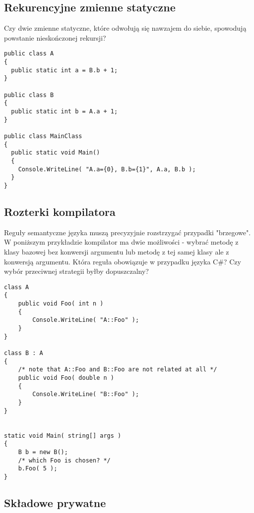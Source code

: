 \subsection{Rekurencyjne zmienne statyczne}

Czy dwie zmienne statyczne, które odwołują się nawzajem do siebie, spowodują powstanie nieskończonej rekursji?

\begin{scriptsize}
\begin{verbatim}
public class A
{
  public static int a = B.b + 1;
}

public class B
{
  public static int b = A.a + 1;
}
 
public class MainClass
{
  public static void Main()
  {
    Console.WriteLine( "A.a={0}, B.b={1}", A.a, B.b );
  }
}
\end{verbatim}
\end{scriptsize}

\subsection{Rozterki kompilatora}

Reguły semantyczne języka muszą precyzyjnie rozstrzygać przypadki "brzegowe". W poniższym przykładzie kompilator ma dwie możliwości - wybrać metodę z klasy bazowej bez konwersji argumentu lub metodę z tej samej klasy
ale z konwersją argumentu. Która reguła obowiązuje w przypadku języka C\#? Czy wybór przeciwnej strategii byłby dopuszczalny?

\begin{scriptsize}
\begin{verbatim}
class A
{
    public void Foo( int n ) 
    {
        Console.WriteLine( "A::Foo" );
    }
}
 
class B : A
{
    /* note that A::Foo and B::Foo are not related at all */
    public void Foo( double n ) 
    {
        Console.WriteLine( "B::Foo" );
    }
}
 
 
static void Main( string[] args )
{
    B b = new B();
    /* which Foo is chosen? */
    b.Foo( 5 );
}
\end{verbatim}
\end{scriptsize}

\subsection{Składowe prywatne}

